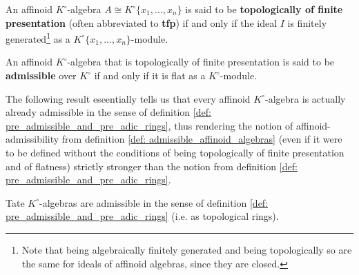             \begin{definition} \label{def: affinoid_algebras_topologically_of_finite_presentation}
                An affinoid $K^{\circ}$-algebra $A \cong K^{\circ}\{x_1, ..., x_n\}$ is said to be \textbf{topologically of finite presentation} (often abbreviated to \textbf{tfp}) if and only if the ideal $I$ is finitely generated\footnote{Note that being algebraically finitely generated and being topologically so are the same for ideals of affinoid algebras, since they are closed.} as a $K^{\circ}\{x_1, ..., x_n\}$-module. 
            \end{definition}
            \begin{definition} \label{def: admissible_affinoid_algebras}
                An affinoid $K^{\circ}$-algebra that is topologically of finite presentation is said to be \textbf{admissible} over $K^{\circ}$ if and only if it is flat as a $K^{\circ}$-module. 
            \end{definition}
            The following result eseentially tells us that every affinoid $K^{\circ}$-algebra is actually already admissible in the sense of definition \ref{def: pre_admissible_and_pre_adic_rings}, thus rendering the notion of affinoid-admissibility from definition \ref{def: admissible_affinoid_algebras} (even if it were to be defined without the conditions of being topologically of finite presentation and of flatness) strictly stronger than the notion from definition \ref{def: pre_admissible_and_pre_adic_rings}. 
            \begin{proposition} \label{prop: tate_algebras_over_valuation_rings_are_topologically_pre_admissible}
                Tate $K^{\circ}$-algebras are admissible in the sense of definition \ref{def: pre_admissible_and_pre_adic_rings} (i.e. as topological rings).
            \end{proposition}
